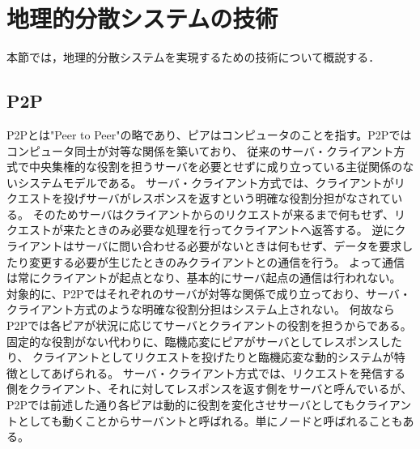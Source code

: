\section{地理的分散システムの技術}
\label{background:geographically-disdtributed-system-technology}
本節では，地理的分散システムを実現するための技術について概説する．

\subsection{P2P}
P2Pとは"Peer to Peer"の略であり、ピアはコンピュータのことを指す。P2Pではコンピュータ同士が対等な関係を築いており、
従来のサーバ・クライアント方式で中央集権的な役割を担うサーバを必要とせずに成り立っている主従関係のないシステムモデルである。
サーバ・クライアント方式では、クライアントがリクエストを投げサーバがレスポンスを返すという明確な役割分担がなされている。
そのためサーバはクライアントからのリクエストが来るまで何もせず、リクエストが来たときのみ必要な処理を行ってクライアントへ返答する。
逆にクライアントはサーバに問い合わせる必要がないときは何もせず、データを要求したり変更する必要が生じたときのみクライアントとの通信を行う。
よって通信は常にクライアントが起点となり、基本的にサーバ起点の通信は行われない。
対象的に、P2Pではそれぞれのサーバが対等な関係で成り立っており、サーバ・クライアント方式のような明確な役割分担はシステム上されない。
何故ならP2Pでは各ピアが状況に応じてサーバとクライアントの役割を担うからである。固定的な役割がない代わりに、臨機応変にピアがサーバとしてレスポンスしたり、
クライアントとしてリクエストを投げたりと臨機応変な動的システムが特徴としてあげられる。
サーバ・クライアント方式では、リクエストを発信する側をクライアント、それに対してレスポンスを返す側をサーバと呼んでいるが、
P2Pでは前述した通り各ピアは動的に役割を変化させサーバとしてもクライアントとしても動くことからサーバントと呼ばれる。単にノードと呼ばれることもある。

